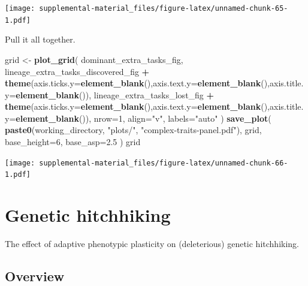 \documentclass[]{book}
\newenvironment{Shaded}{\begin{snugshade}}{\end{snugshade}}
\newcommand{\DataTypeTok}[1]{\textcolor[rgb]{0.13,0.29,0.53}{#1}}
\newcommand{\DecValTok}[1]{\textcolor[rgb]{0.00,0.00,0.81}{#1}}
\newcommand{\FloatTok}[1]{\textcolor[rgb]{0.00,0.00,0.81}{#1}}
\newcommand{\KeywordTok}[1]{\textcolor[rgb]{0.13,0.29,0.53}{\textbf{#1}}}
\newcommand{\NormalTok}[1]{#1}
\newcommand{\OperatorTok}[1]{\textcolor[rgb]{0.81,0.36,0.00}{\textbf{#1}}}
\newcommand{\StringTok}[1]{\textcolor[rgb]{0.31,0.60,0.02}{#1}}
\begin{document}
\texttt{[image: supplemental-material\_files/figure-latex/unnamed-chunk-65-1.pdf]}

Pull it all together.

\begin{Shaded}
\begin{Highlighting}[]
\NormalTok{grid <-}\StringTok{ }\KeywordTok{plot_grid}\NormalTok{(}
\NormalTok{  dominant_extra_tasks_fig,}
\NormalTok{  lineage_extra_tasks_discovered_fig }\OperatorTok{+}\StringTok{ }\KeywordTok{theme}\NormalTok{(}\DataTypeTok{axis.ticks.y=}\KeywordTok{element_blank}\NormalTok{(),}\DataTypeTok{axis.text.y=}\KeywordTok{element_blank}\NormalTok{(),}\DataTypeTok{axis.title.y=}\KeywordTok{element_blank}\NormalTok{()),}
\NormalTok{  lineage_extra_tasks_lost_fig }\OperatorTok{+}\StringTok{ }\KeywordTok{theme}\NormalTok{(}\DataTypeTok{axis.ticks.y=}\KeywordTok{element_blank}\NormalTok{(),}\DataTypeTok{axis.text.y=}\KeywordTok{element_blank}\NormalTok{(),}\DataTypeTok{axis.title.y=}\KeywordTok{element_blank}\NormalTok{()),}
  \DataTypeTok{nrow=}\DecValTok{1}\NormalTok{,}
  \DataTypeTok{align=}\StringTok{"v"}\NormalTok{,}
  \DataTypeTok{labels=}\StringTok{"auto"}
\NormalTok{)}
\KeywordTok{save_plot}\NormalTok{(}
   \KeywordTok{paste0}\NormalTok{(working_directory, }\StringTok{"plots/"}\NormalTok{, }\StringTok{"complex-traits-panel.pdf"}\NormalTok{),}
\NormalTok{   grid,}
   \DataTypeTok{base_height=}\DecValTok{6}\NormalTok{,}
   \DataTypeTok{base_asp=}\FloatTok{2.5}
\NormalTok{)}
\NormalTok{grid}
\end{Highlighting}
\end{Shaded}

\texttt{[image: supplemental-material\_files/figure-latex/unnamed-chunk-66-1.pdf]}

\hypertarget{genetic-hitchhiking}{%
\chapter{Genetic hitchhiking}\label{genetic-hitchhiking}}

The effect of adaptive phenotypic plasticity on (deleterious) genetic hitchhiking.

\hypertarget{overview-3}{%
\section{Overview}\label{overview-3}}
\end{document}
